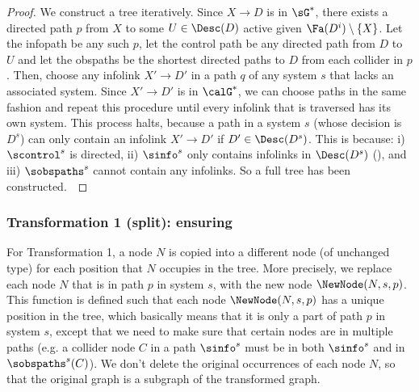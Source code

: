 \begin{proof}
We construct a tree iteratively. 
Since $X \to D$ is in $\sG^*$, 
there exists a directed path $p$ from $X$ to some $U \in \Desc(D)$ active given $\Fa(D^i) \setminus \{X\}$.
Let the infopath be any such $p$, let the control path be any directed path from $D$ to $U$ and 
let the obspaths be the shortest directed paths to $D$ from each collider in $p$.
Then, choose any infolink $X' \to D'$ 
in a path $q$ of any system $s$ 
that lacks an associated system.
Since $X' \to D'$ is in $\calG^*$, 
we can choose paths in the same fashion
and repeat this procedure 
until every infolink that is traversed 
has its own system.
This process halts, because a
path in a system $s$ (whose decision is $D^s$)
can only contain an infolink $X' \to D'$ if $D' \in \Desc(D^s)$.
This is because:
i) $\scontrol^s$ is directed,
ii) $\sinfo^s$ only contains infolinks in $\Desc(D^s)$
(),
and iii) $\sobspaths^s$ cannot contain any infolinks.
So a full tree has been constructed.~
\end{proof}




\subsubsection{Transformation 1 (split): ensuring \systemsAndPathsUniqueness} \label{subsubsec:split-1}


For Transformation 1, a node $N$ is copied into a different node
(of unchanged type)
for each position that $N$ occupies in the tree. More precisely, we replace each node $N$ that is in path $p$ in system $s$, with the new node $\NewNode(N,s,p)$. This function is defined such that each node $\NewNode(N,s,p)$ has a unique position in the tree, which basically means that it is only a part of path $p$ in system $s$, except that we need to make sure that certain nodes are in multiple paths (e.g. a collider node $C$ in a path $\sinfo^s$ must be in both $\sinfo^s$ and in $\sobspaths^s(C)$). We don't delete the original occurrences of each node $N$, so that the original graph is a subgraph of the transformed graph.



    
    



